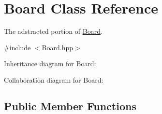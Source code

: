 \hypertarget{classBoard}{}\section{Board Class Reference}
\label{classBoard}


The adstracted portion of \hyperlink{classBoard}{Board}.  




{\ttfamily \#include $<$Board.\+hpp$>$}



Inheritance diagram for Board\+:


Collaboration diagram for Board\+:
\subsection*{Public Member Functions}

